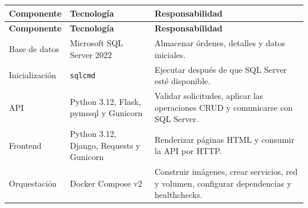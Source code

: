 \documentclass[11pt,a4paper]{article}
\newcommand{\codigo}[1]{\texttt{\detokenize{#1}}}
\begin{document}
\begin{longtable}{>{\raggedright\arraybackslash}p{} >{\raggedright\arraybackslash}p{} >{\raggedright\arraybackslash}p{}}
\toprule
\textbf{Componente} & \textbf{Tecnología} & \textbf{Responsabilidad}\\
\midrule
\endfirsthead
\toprule
\textbf{Componente} & \textbf{Tecnología} & \textbf{Responsabilidad}\\
\midrule
\endhead
Base de datos & Microsoft SQL Server 2022 & Almacenar órdenes, detalles y datos iniciales.\\
Inicialización & \texttt{sqlcmd} & Ejecutar \codigo{db/init.sql} después de que SQL Server esté disponible.\\
API & Python 3.12, Flask, pymssql y Gunicorn & Validar solicitudes, aplicar las operaciones CRUD y comunicarse con SQL Server.\\
Frontend & Python 3.12, Django, Requests y Gunicorn & Renderizar páginas HTML y consumir la API por HTTP.\\
Orquestación & Docker Compose v2 & Construir imágenes, crear servicios, red y volumen, configurar dependencias y healthchecks.\\
\bottomrule
\end{longtable}
\end{document}
